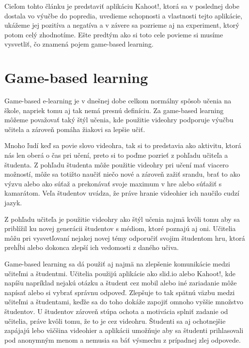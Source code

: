 \documentclass[10pt,oneside,slovak,a4paper]{article}
\begin{document}
	Cieľom tohto článku je predstaviť aplikáciu Kahoot!, ktorá sa v poslednej dobe dostala vo výučbe do popredia, uvedieme schopnosti a vlastnosti tejto aplikácie, ukážeme jej pozitíva a negatíva a v závere sa pozrieme aj na experiment, ktorý potom celý zhodnotíme. Ešte predtým ako si toto cele povieme si musíme vysvetliť, čo znamená pojem game-based learning.






\section{Game-based learning} \label{ml}

Game-based e-learning je v dnešnej dobe celkom normálny spôsob učenia na škole, napriek tomu aj tak nemá presnú definíciu. Za game-based learning môžeme považovať taký štýl učenia, kde použitie videohry podporuje výučbu učitela a zároveň pomáha žiakovi sa lepšie učiť.\cite{Perrota}
	
	Mnoho ľudí keď sa povie slovo videohra, tak si to predstavia ako aktivitu, ktorá nás len oberá o čas pri učení, preto si to poďme pozrieť z pohľadu učiteľa a študenta\cite{Perrota}. Z pohľadu študenta môže použitie videohry pri učení mať viacero možností, môže sa totižto naučiť niečo nové a zároveň zažiť srandu, brať to ako výzvu alebo ako súťaž a prekonávať svoje maximum v hre alebo súťažiť s kamarátom\cite{Perrota}. Veľa študentov uvádza, že práve hranie videohier ich naučilo cudzí jazyk. 
	
	Z pohľadu učiteľa je použitie videohry ako štýl učenia najmä kvôli tomu aby sa priblížil ku novej generácii študentov s médiom, ktoré poznajú aj oni. Učitelia môžu pri vysvetľovaní nejakej novej témy odporučiť svojim študentom hru, ktorá prehĺbi alebo dokonca zlepší ich vedomosti z daného učiva\cite{Perrota}. 
	
	Game-based learning sa dá použiť aj najmä na zlepšenie komunikácie medzi učiteľmi a študentmi. Učitelia použijú aplikácie ako slid.io alebo Kahoot!, kde napíšu napríklad nejakú otázku a študent cez mobil alebo iné zariadanie môže napísať alebo si vybrať správnu odpoveď. Zlepšuje to tak spätnú väzbu medzi učiteľmi a študentami, keďže sa do toho dokáže zapojiť omnoho vyššie množstvo študentov. U študentov zároveň stúpa ochota a motivácia splniť zadanie od učitelia, práve kvôli tomu, že to je cez videohru.\cite{Perrota} Študenti sa aj ochotnejšie zapájajú lebo väčšina videohier a aplikácii umožňuje aby sa študenti prihlasovali pod anonymným menom a nemusia sa báť výsmechu z prípadnej zlej odpovede.
	
\end{document}
